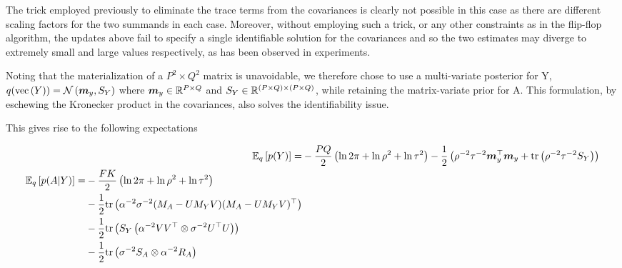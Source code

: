The trick employed previously to eliminate the trace terms from the covariances is clearly not possible in this case as there are different scaling factors for the two summands in each case. Moreover, without employing such a trick, or any other constraints as in the flip-flop algorithm, the updates above fail to specify a single identifiable solution for the covariances and so the two estimates may diverge to extremely small and large values respectively, as has been observed in experiments.


%



Noting that the materialization of a $P^2 \times Q^2$ matrix is unavoidable, we therefore chose to use a multi-variate posterior for Y, $q(\text{vec}\left(Y\right)) = \mathcal{N} \left( {\bm m_y}, {S_Y} \right)$ where $\bm m_y \in { \mathbb{R}^{P\times Q} }$ and $S_Y \in { \mathbb{R}^{(P \times Q) \times (P \times Q)} }$, while retaining the matrix-variate prior for A. This formulation, by eschewing the Kronecker product in the covariances, also solves the identifiability issue.


This gives rise to the following expectations

\begin{align}
\ex{p(Y)}{q} = & -\halve{PQ}\left(\ln 2\pi + \ln \rho^2 + \ln \tau^2\right) - \half \left(\rho^{-2}\tau^{-2} \vv{m}_y\T\vv{m}_y + \Tr{\rho^{-2}\tau^{-2} S_Y}\right) \\
\begin{split}
\ex{p(A|Y)}{q} = & -\halve{FK}\left(\ln 2\pi + \ln \rho^2 + \ln \tau^2\right) \\
 & -\half \Tr{\alpha^{-2}\sigma^{-2}(M_A - U M_Y V)(M_A - U M_Y V)\T} \\
 & -\half \Tr{S_Y \left(\alpha^{-2}V V\T \otimes \sigma^{-2}U \T U\right)} \\
 & -\half \Tr{\sigma^{-2}S_A\otimes \alpha^{-2}R_A}
 \label{eqn:free_enery_u_and_v}
\end{split}
\end{align}

